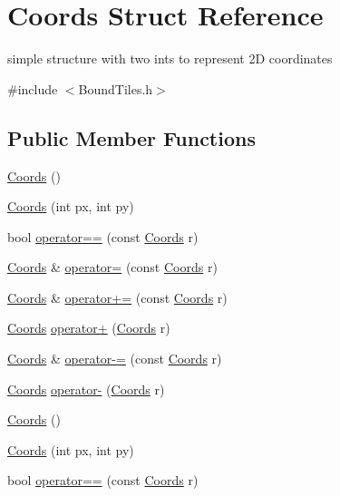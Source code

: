 \hypertarget{struct_coords}{\section{\-Coords \-Struct \-Reference}
\label{struct_coords}
}


simple structure with two ints to represent 2\-D coordinates  




{\ttfamily \#include $<$\-Bound\-Tiles.\-h$>$}

\subsection*{\-Public \-Member \-Functions}
\begin{DoxyCompactItemize}
\item 
\hyperlink{struct_coords_a5922d1783cefa759950faa50ac347191}{\-Coords} ()
\item 
\hyperlink{struct_coords_aa268e580151ea70eec212852dd4c5f94}{\-Coords} (int px, int py)
\item 
bool \hyperlink{struct_coords_a7507f92d1feefa3355ae8e9edae34e54}{operator==} (const \hyperlink{struct_coords}{\-Coords} r)
\item 
\hyperlink{struct_coords}{\-Coords} \& \hyperlink{struct_coords_a25bcb0e2d2f5677a10b7652e90a6f97b}{operator=} (const \hyperlink{struct_coords}{\-Coords} r)
\item 
\hyperlink{struct_coords}{\-Coords} \& \hyperlink{struct_coords_a2549173108b2479b62fd79b82ec54e01}{operator+=} (const \hyperlink{struct_coords}{\-Coords} r)
\item 
\hyperlink{struct_coords}{\-Coords} \hyperlink{struct_coords_a168a9ed9edbffaf04e67c5b39306ca99}{operator+} (\hyperlink{struct_coords}{\-Coords} r)
\item 
\hyperlink{struct_coords}{\-Coords} \& \hyperlink{struct_coords_a9f61875c64b3726afd0bb0d465889bad}{operator-\/=} (const \hyperlink{struct_coords}{\-Coords} r)
\item 
\hyperlink{struct_coords}{\-Coords} \hyperlink{struct_coords_a7cc7a225781b6bbad3e00a5e9572fee1}{operator-\/} (\hyperlink{struct_coords}{\-Coords} r)
\item 
\hyperlink{struct_coords_a5922d1783cefa759950faa50ac347191}{\-Coords} ()
\item 
\hyperlink{struct_coords_aa268e580151ea70eec212852dd4c5f94}{\-Coords} (int px, int py)
\item 
bool \hyperlink{struct_coords_a7507f92d1feefa3355ae8e9edae34e54}{operator==} (const \hyperlink{struct_coords}{\-Coords} r)

\end{DoxyCompactItemize}
